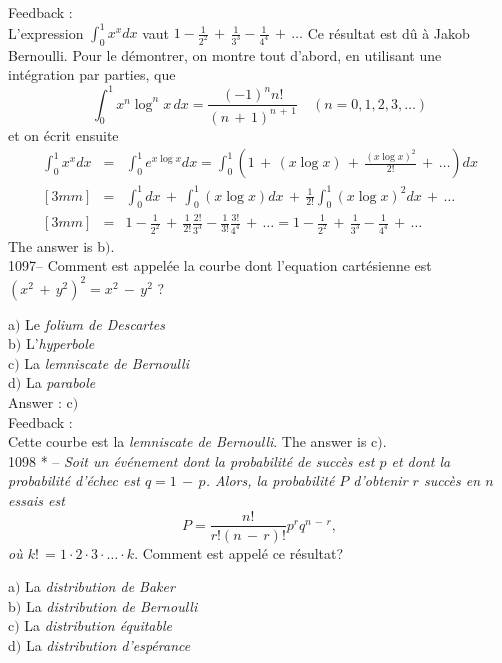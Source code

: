 ﻿\documentclass[letterpaper, 12pt]{article}
\begin{document}
Feedback : \\
L'expression $\int_0^1x^xdx$ vaut
$1-\frac1{2^2}\,+\,\frac1{3^3}-\frac1{4^4}\,+\,\ldots$ Ce r\'esultat
est d\^u \`a Jakob Bernoulli. Pour le d\'emontrer, on montre tout
d'abord, en utilisant une int\'egration par parties, que
$$\displaystyle{\int_0^1x^n\log^nx\,dx=\frac{(-1)^nn!}{(n\,+\,1)^{n\,+\,1}}\quad(n=0,1,2,3,\ldots)}$$
et on \'ecrit ensuite
\begin{eqnarray*}
\int_0^1x^xdx & = & \displaystyle{\int_0^1e^{x\log
x}dx=\int_0^1\left(1\,+\,(x\log x)\,+\,\frac{(x\log
x)^2}{2!}\,+\,\ldots\right)dx} \\ [3mm]
              & = & \displaystyle{\int_0^1dx\,+\,\int_0^1(x\log
x)dx\,+\,\frac1{2!}\int_0^1(x\log x)^2dx\,+\,\ldots} \\ [3mm]
              & = &
\displaystyle{1-\frac1{2^2}\,+\,\frac1{2!}\frac{2!}{3^3}-\frac1{3!}\frac{3!}{4^4}\,+\,\ldots=1-\frac1{2^2}\,+\,\frac1{3^3}-\frac1{4^4}\,+\,\ldots}
\end{eqnarray*}
The answer is b$)$.\\

1097-- Comment est appel\'ee la courbe dont l'equation
cart\'esienne est $(x^2\,+\,y^2)^2=x^2\,-\,y^2$ ?

a$)$ Le {\sl folium de Descartes} \\
b$)$ L'{\sl hyperbole}  \\
c$)$ La {\sl lemniscate de Bernoulli}  \\
d$)$ La {\sl parabole}\\

Answer : c$)$\\

Feedback : \\
Cette courbe est la {\sl lemniscate de Bernoulli}.
The answer is c$)$.\\

1098 * -- {\sl Soit un \'ev\'enement dont la probabilit\'e de
succ\`es est $p$ et dont la probabilit\'e d'\'echec est $q=1\,-\,p$.
Alors, la probabilit\'e $P$ d'obtenir $r$ succ\`es en $n$ essais est
$$\displaystyle{P=\frac{n!}{r!(n\,-\,r)!}p^rq^{n\,-\,r}},$$
o\`u $k!\,=1\cdot2\cdot3\cdot\ldots\cdot k$}. Comment est appel\'e
ce r\'esultat?

a$)$ La {\sl distribution de Baker} \\
b$)$ La {\sl distribution de Bernoulli}   \\
c$)$ La {\sl distribution \'equitable}  \\
d$)$ La {\sl distribution d'esp\'erance}\\
\end{document}
